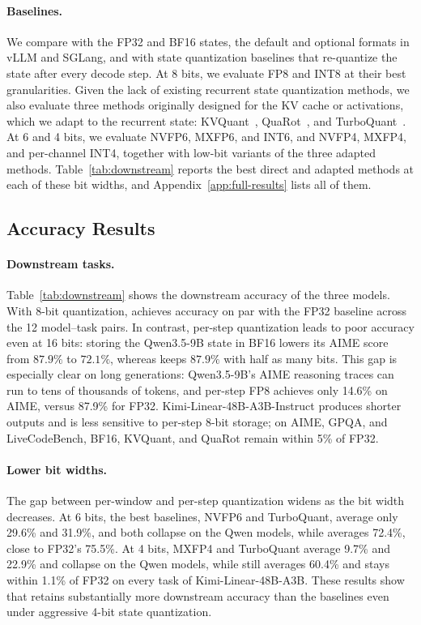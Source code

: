 \paragraph{Baselines.}
We compare \method{} with the FP32 and BF16 states, the default and optional formats in vLLM and SGLang, and with state quantization baselines that re-quantize the state after every decode step.
At 8 bits, we evaluate FP8 and INT8 at their best granularities.
Given the lack of existing recurrent state quantization methods, we also evaluate three methods originally designed for the KV cache or activations, which we adapt to the recurrent state: KVQuant~\citep{hooper2024kvquant}, QuaRot~\citep{ashkboos2024quarot}, and TurboQuant~\citep{zandieh2026turboquant}.
At 6 and 4 bits, we evaluate NVFP6, MXFP6, and INT6, and NVFP4, MXFP4, and per-channel INT4, together with low-bit variants of the three adapted methods.
Table~\ref{tab:downstream} reports the best direct and adapted methods at each of these bit widths, and Appendix~\ref{app:full-results} lists all of them.

\subsection{Accuracy Results}
\label{sec:downstream}
\paragraph{Downstream tasks.}
Table~\ref{tab:downstream} shows the downstream accuracy of the three models.
With 8-bit quantization, \method{} achieves accuracy on par with the FP32 baseline across the 12 model--task pairs.
In contrast, per-step quantization leads to poor accuracy even at 16 bits: storing the Qwen3.5-9B state in BF16 lowers its AIME score from $87.9\%$ to $72.1\%$, whereas \method{} keeps $87.9\%$ with half as many bits.
This gap is especially clear on long generations: Qwen3.5-9B's AIME reasoning traces can run to tens of thousands of tokens, and per-step FP8 achieves only 14.6\% on AIME, versus 87.9\% for FP32.
Kimi-Linear-48B-A3B-Instruct produces shorter outputs and is less sensitive to per-step 8-bit storage; on AIME, GPQA, and LiveCodeBench, BF16, KVQuant, and QuaRot remain within 5\% of FP32.

\paragraph{Lower bit widths.}
The gap between per-window and per-step quantization widens as the bit width decreases.
At 6 bits, the best baselines, NVFP6 and TurboQuant, average only 29.6\% and 31.9\%, and both collapse on the Qwen models, while \method{} averages 72.4\%, close to FP32's 75.5\%.
At 4 bits, MXFP4 and TurboQuant average 9.7\% and 22.9\% and collapse on the Qwen models, while \method{} still averages 60.4\% and stays within 1.1\% of FP32 on every task of Kimi-Linear-48B-A3B.
These results show that \method{} retains substantially more downstream accuracy than the baselines even under aggressive 4-bit state quantization.

